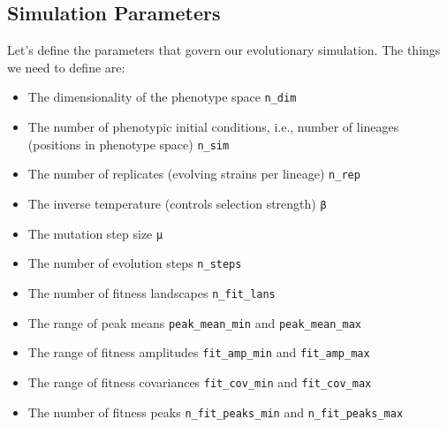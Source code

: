 \documentclass[
]{scrartcl}
\providecommand{\tightlist}{%
  \setlength{\itemsep}{0pt}\setlength{\parskip}{0pt}}\usepackage{longtable,booktabs,array}
\begin{document}
\subsection{Simulation Parameters}\label{simulation-parameters}

Let's define the parameters that govern our evolutionary simulation. The
things we need to define are:

\begin{itemize}
\tightlist
\item
  The dimensionality of the phenotype space \texttt{n\_dim}
\item
  The number of phenotypic initial conditions, i.e., number of lineages
  (positions in phenotype space) \texttt{n\_sim}
\item
  The number of replicates (evolving strains per lineage)
  \texttt{n\_rep}
\item
  The inverse temperature (controls selection strength) \texttt{β}
\item
  The mutation step size \texttt{µ}
\item
  The number of evolution steps \texttt{n\_steps}
\item
  The number of fitness landscapes \texttt{n\_fit\_lans}
\item
  The range of peak means \texttt{peak\_mean\_min} and
  \texttt{peak\_mean\_max}
\item
  The range of fitness amplitudes \texttt{fit\_amp\_min} and
  \texttt{fit\_amp\_max}
\item
  The range of fitness covariances \texttt{fit\_cov\_min} and
  \texttt{fit\_cov\_max}
\item
  The number of fitness peaks \texttt{n\_fit\_peaks\_min} and
  \texttt{n\_fit\_peaks\_max}
\end{itemize}
\end{document}
